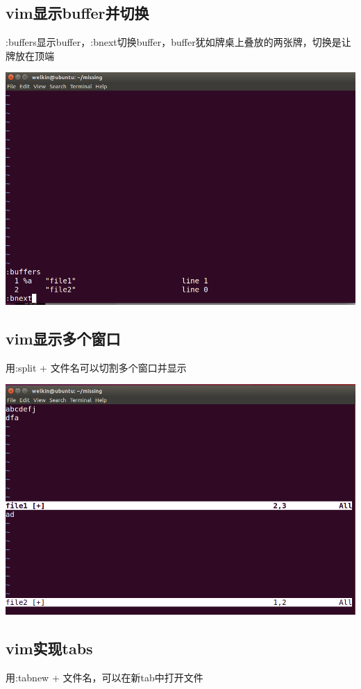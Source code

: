 \documentclass[UTF8,a4paper]{ctexart}
\begin{document}
\begin{sloppypar}
	\subsection{vim显示buffer并切换}
	:buffers显示buffer，:bnext切换buffer，buffer犹如牌桌上叠放的两张牌，切换是让牌放在顶端
	
	\includegraphics[width = 16cm]{16}
	
	\subsection{vim显示多个窗口}
	用:split + 文件名可以切割多个窗口并显示
	
	\includegraphics[width = 16cm]{17}
	
	\subsection{vim实现tabs}
	用:tabnew + 文件名，可以在新tab中打开文件
	

\end{sloppypar}
\end{document}

